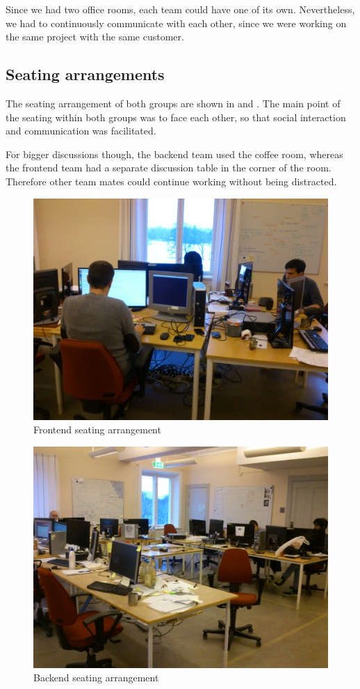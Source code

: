 Since we had two office rooms, each team could have one of its own.
Nevertheless, we had to continuously communicate with each other,
since we were working on the same project with the same customer.

\subsection{Seating arrangements}
The seating arrangement of both groups are shown in  and
. The main point of the seating within both groups
was to face each other, so that social interaction and communication was facilitated. 

For bigger discussions though, the backend team used the coffee room, whereas the
frontend team had a separate discussion table in the corner of the room. Therefore
other team mates could continue working without being distracted.

\begin{figure}
\centering
\includegraphics[scale=0.1]{graphics/frontend_seating}
\caption{Frontend seating arrangement}\label{fig:frontend_seating}
\end{figure}


\begin{figure}
\centering
\includegraphics[scale=0.1]{graphics/backend_seating}
\caption{Backend seating arrangement}\label{fig:backend_seating}
\end{figure}
